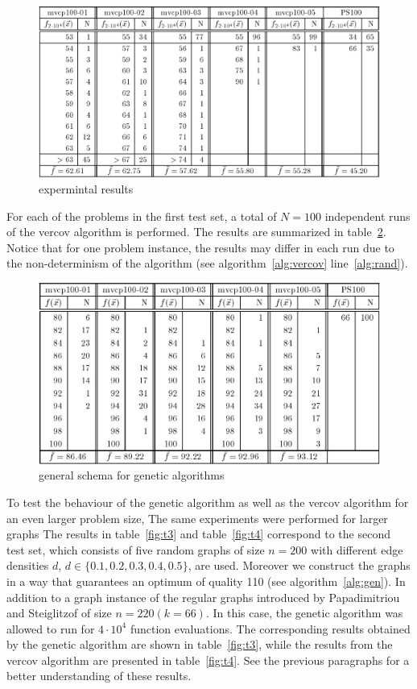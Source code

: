 \documentclass[12pt]{article}
\begin{document}
\begin{figure}[!htbp]
\centering
\includegraphics[width=1\textwidth]{t1}
\caption[GA applied on n=100 graph]{expermintal results}
\label{fig:t1}
\end{figure}



For each of the problems in the first test set, a total of $N=100$
independent runs of the vercov algorithm is performed. The results are summarized in table~\ref{fig:t2}.
Notice that for one problem instance, the results may differ in each run due to the
non-determinism of the algorithm (see algorithm~\ref{alg:vercov} line~\ref{alg:rand}).

\begin{figure}[!htbp]
\centering
\includegraphics[width=1\textwidth]{t2}
\caption{general schema for genetic algorithms}
\label{fig:t2}
\end{figure}

To test the behaviour of the genetic algorithm
as well as the vercov algorithm for an even
larger problem size, The same experiments were performed for larger graphs
The results in table~\ref{fig:t3}
and table~\ref{fig:t4} correspond to the second test set, which consists of
five random graphs of size $n = 200$ with different
edge densities $d$, $d \in \{0.1, 0.2, 0.3, 0.4, 0.5\}$, are used.
Moreover we construct the graphs in a way that guarantees an optimum of quality 110
(see algorithm~\ref{alg:gen}).
In addition to a graph instance of the regular graphs introduced by
Papadimitriou and Steiglitzof of size $n = 220 (k=66)$.
In this case, the genetic algorithm
was allowed to run for $4 \cdot 10^4$ function evaluations.
The corresponding results obtained by the
genetic algorithm are shown in table~\ref{fig:t3}, while the results
from the vercov algorithm are presented in table~\ref{fig:t4}.
See the previous paragraphs for a better understanding of these results.
\end{document}
